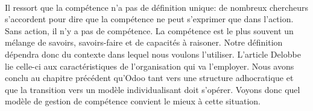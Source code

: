 \paragraph{}Il ressort que la compétence n'a pas de définition unique: de nombreux chercheurs s'accordent pour dire que la compétence ne peut s'exprimer que dans l'action. Sans action, il n'y a pas de compétence. La compétence est le plus souvent un mélange de savoirs, savoirs-faire et de capacités à raisoner. Notre définition dépendra donc du contexte dans lequel nous voulons l'utiliser. L'article Delobbe\citep[pp.31]{delobbe} lie celle-ci aux caractéristiques de l'organisation qui va l'employer. Nous avons conclu au chapitre précédent qu'Odoo tant vers une structure adhocratique et que la transition vers un modèle individualisant doit s'opérer. Voyons donc quel modèle de gestion de compétence convient le mieux à cette situation.


